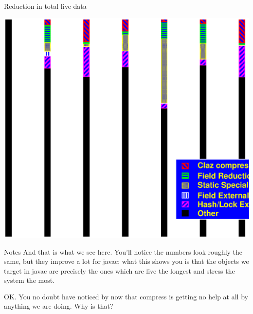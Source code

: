 \documentclass[%
pdf,
colorBG,
slideColor,
nototal,
oqe
]{prosper}
\newenvironment{talknotes}{\begin{slide}{Notes}\tiny}{\end{slide}}
\begin{document}
\begin{slide}{Reduction in total live data}
\begin{center}
\includegraphics[scale=0.45]{Figures/oopsla-ttllive-color.eps}
\end{center}
\end{slide}

\begin{talknotes}
And that is what we see here.  You'll notice the numbers look roughly
the same, but they improve a lot for javac; what this shows you is
that the objects we target in javac are precisely the ones which are
live the longest and stress the system the most.

OK.  You no doubt have noticed by now that compress is getting no help
at all by anything we are doing.  Why is that?
\end{talknotes}
\end{document}

